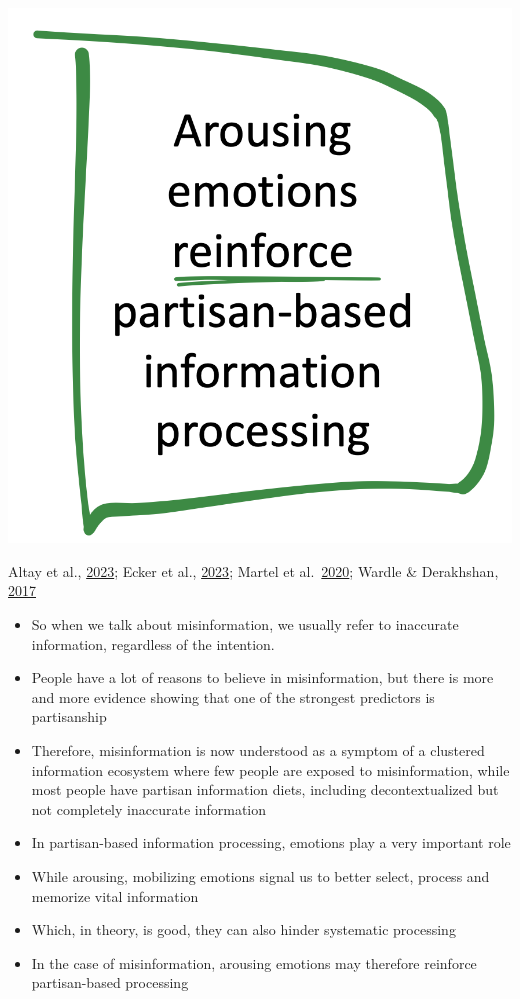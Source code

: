 \documentclass[
  letterpaper,
  DIV=11,
  numbers=noendperiod]{scrartcl}
\begin{document}
\includegraphics[width=10.41667in,height=\textheight]{images/emotion-theory.png}

Altay et al., \href{https://doi.org/10.1177/20563051221150412}{2023};
Ecker et al.,
\href{https://www.nature.com/articles/s44159-021-00006-y}{2023}; Martel
et
al.~\href{https://www.ncbi.nlm.nih.gov/pmc/articles/PMC7539247/}{2020};
Wardle \& Derakhshan,
\href{http://tverezo.info/wp-content/uploads/2017/11/PREMS-162317-GBR-2018-Report-desinformation-A4-BAT.pdf}{2017}

\begin{itemize}
\item
  So when we talk about misinformation, we usually refer to inaccurate
  information, regardless of the intention.
\item
  People have a lot of reasons to believe in misinformation, but there
  is more and more evidence showing that one of the strongest predictors
  is partisanship
\item
  Therefore, misinformation is now understood as a symptom of a
  clustered information ecosystem where few people are exposed to
  misinformation, while most people have partisan information diets,
  including decontextualized but not completely inaccurate information
\item
  In partisan-based information processing, emotions play a very
  important role
\item
  While arousing, mobilizing emotions signal us to better select,
  process and memorize vital information
\item
  Which, in theory, is good, they can also hinder systematic processing
\item
  In the case of misinformation, arousing emotions may therefore
  reinforce partisan-based processing
\end{itemize}
\end{document}
